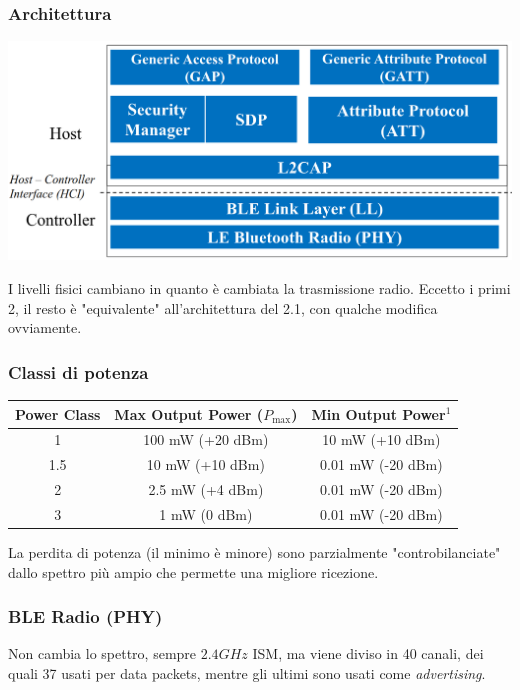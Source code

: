 \newpage

\subsubsection{Architettura}
\begin{center}
	\includegraphics[width=0.8\linewidth]{img/wpan/blearch}
\end{center}

I livelli fisici cambiano in quanto è cambiata la trasmissione radio. Eccetto i primi 2, il resto è "equivalente" all'architettura del 2.1, con qualche modifica ovviamente.

\subsubsection{Classi di potenza}
\begin{center}
	\begin{tabular}{|c|c|c|}
		\hline
		\textbf{Power Class} & \textbf{Max Output Power ($P_{\text{max}}$)} & \textbf{Min Output Power$^1$} \\
		\hline
		1   & 100 mW (+20 dBm)  & 10 mW (+10 dBm)  \\
		1.5 & 10 mW (+10 dBm)   & 0.01 mW (-20 dBm) \\
		2   & 2.5 mW (+4 dBm)   & 0.01 mW (-20 dBm) \\
		3   & 1 mW (0 dBm)      & 0.01 mW (-20 dBm) \\
		\hline
	\end{tabular}
\end{center}
La perdita di potenza (il minimo è minore) sono parzialmente "controbilanciate" dallo spettro più ampio che permette una migliore ricezione.


\subsubsection{BLE Radio (PHY)}

Non cambia lo spettro, sempre $2.4GHz$ ISM, ma viene diviso in 40 canali, dei quali 37 usati per data packets, mentre gli ultimi sono usati come \textit{advertising}.\\

